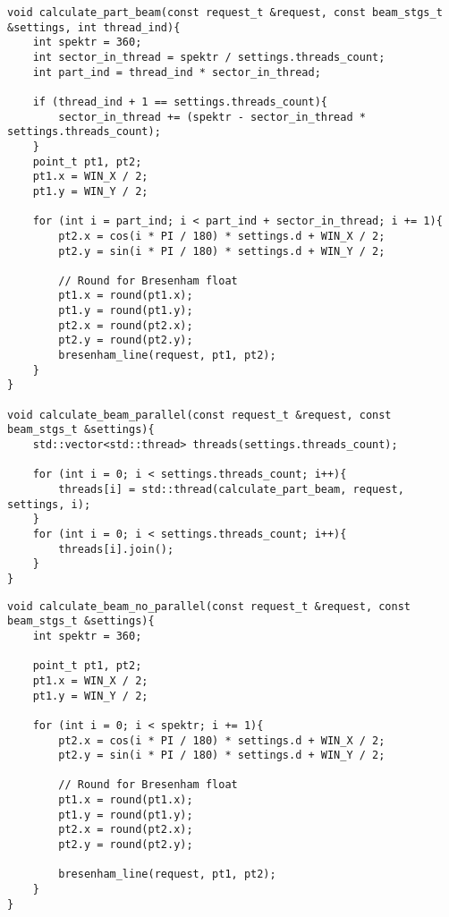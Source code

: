 \begin{center}
    \captionsetup{justification=raggedright,singlelinecheck=off}
    \begin{lstlisting}[label=lst:par_alg,caption=Алгоритм построения спектра отрезков по Брезенехему (c многопоточностью)]
void calculate_part_beam(const request_t &request, const beam_stgs_t &settings, int thread_ind){   
    int spektr = 360;
    int sector_in_thread = spektr / settings.threads_count;
    int part_ind = thread_ind * sector_in_thread;

    if (thread_ind + 1 == settings.threads_count){
        sector_in_thread += (spektr - sector_in_thread * settings.threads_count);
    }
    point_t pt1, pt2;
    pt1.x = WIN_X / 2;
    pt1.y = WIN_Y / 2;

    for (int i = part_ind; i < part_ind + sector_in_thread; i += 1){
        pt2.x = cos(i * PI / 180) * settings.d + WIN_X / 2;
        pt2.y = sin(i * PI / 180) * settings.d + WIN_Y / 2;

        // Round for Bresenham float
        pt1.x = round(pt1.x);
        pt1.y = round(pt1.y);
        pt2.x = round(pt2.x);
        pt2.y = round(pt2.y); 
        bresenham_line(request, pt1, pt2);
    }
}

void calculate_beam_parallel(const request_t &request, const beam_stgs_t &settings){
    std::vector<std::thread> threads(settings.threads_count);

    for (int i = 0; i < settings.threads_count; i++){
        threads[i] = std::thread(calculate_part_beam, request, settings, i);
    }
    for (int i = 0; i < settings.threads_count; i++){
        threads[i].join();
    }
}
\end{lstlisting}
\end{center}


\begin{center}
    \captionsetup{justification=raggedright,singlelinecheck=off}
    \begin{lstlisting}[label=lst:no_par_alg,caption=Алгоритм построения спектра отрезков по Брезенехему (без многопоточности)]
void calculate_beam_no_parallel(const request_t &request, const beam_stgs_t &settings){
	int spektr = 360;

	point_t pt1, pt2;
	pt1.x = WIN_X / 2;
	pt1.y = WIN_Y / 2;

	for (int i = 0; i < spektr; i += 1){
		pt2.x = cos(i * PI / 180) * settings.d + WIN_X / 2;
		pt2.y = sin(i * PI / 180) * settings.d + WIN_Y / 2;

		// Round for Bresenham float
		pt1.x = round(pt1.x);
		pt1.y = round(pt1.y);
		pt2.x = round(pt2.x);
		pt2.y = round(pt2.y);

		bresenham_line(request, pt1, pt2);
	}
}
\end{lstlisting}
\end{center}

